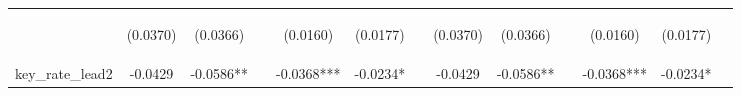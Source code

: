 \documentclass[]{article}
\begin{document}
\begin{center}
\begin{tabular}{lcccccccccccc}
\vspace{4pt} & \begin{footnotesize}(0.0370)\end{footnotesize} & \begin{footnotesize}(0.0366)\end{footnotesize} & \begin{footnotesize}\end{footnotesize} & \begin{footnotesize}(0.0160)\end{footnotesize} & \begin{footnotesize}(0.0177)\end{footnotesize} & \begin{footnotesize}\end{footnotesize} & \begin{footnotesize}(0.0370)\end{footnotesize} & \begin{footnotesize}(0.0366)\end{footnotesize} & \begin{footnotesize}\end{footnotesize} & \begin{footnotesize}(0.0160)\end{footnotesize} & \begin{footnotesize}(0.0177)\end{footnotesize} & \begin{footnotesize}\end{footnotesize} \\
key\_rate\_lead2 & -0.0429 & -0.0586** &  & -0.0368*** & -0.0234* &  & -0.0429 & -0.0586** &  & -0.0368*** & -0.0234* &  \\

\end{tabular}
\end{center}
\end{document}
